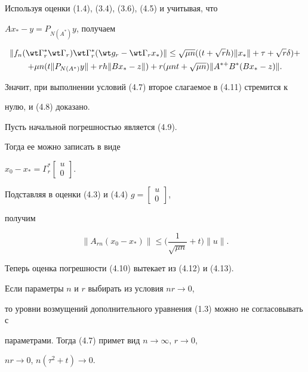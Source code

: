 \begin{pf}
Используя оценки (1.4), (3.4), (3.6), (4.5) и учитывая, что


$Ax_*-y=P_{N(A^*)}y$, получаем


\begin{multline}


\|f_n(\wt \Gamma_r^*\wt \Gamma_r)\wt \Gamma_r^*(\wt g_r-


\wt \Gamma_rx_*)\| \le \sqrt{\mu n}((t+\sqrt{r}h)\|x_*\|+\tau+\sqrt{r}\delta)+\\


%


+\mu n(t\|P_{N(A^*)}y\|+rh\|Bx_*-z\|)+r(\mu nt+\sqrt{\mu n})


\|A^{*+}B^*(Bx_*-z)\|.


\end{multline}


Значит, при выполнении условий (4.7) второе слагаемое в (4.11) стремится к 


нулю, и (4.8) доказано.





Пусть начальной погрешностью является (4.9). 


Тогда ее можно записать в виде\linebreak


$x_0-x_*=\Gamma_r^*\begin{bmatrix}u\\ 0\end{bmatrix}$.


Подставляя в оценки (4.3) и (4.4) $g=\begin{bmatrix}u\\ 0\end{bmatrix}$,


получим


\begin{equation}


\|A_{rn}(x_0-x_*)\| \le \bigg(\frac{1}{\sqrt{\mu n}}+t \bigg)\|u\|.


\end{equation}


Теперь оценка погрешности (4.10) вытекает из (4.12) и (4.13).


\end{pf}








\begin{notenonum}


Если параметры $n$ и $r$ выбирать из условия $nr\to 0$, 


то уровни возмущений дополнительного уравнения (1.3) можно не согласовывать с 


параметрами. Тогда (4.7) примет вид $n\to \infty$, $r\to 0$,


$nr\to 0$, $n(\tau^2+t)\to 0$.


\end{notenonum}








